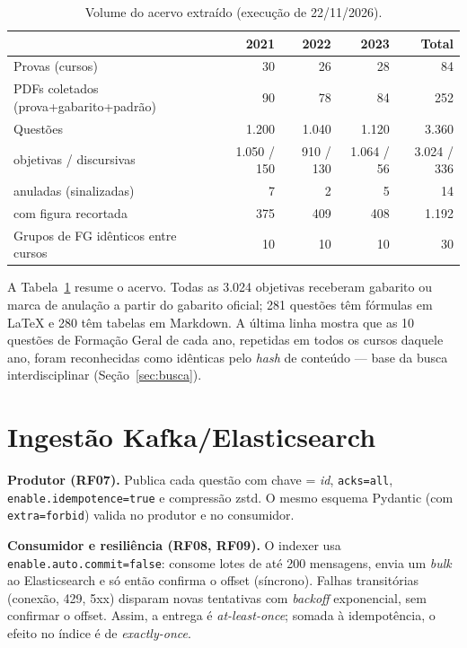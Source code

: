 \documentclass[12pt]{article}
\newcommand{\cod}[1]{\texttt{\small #1}}
\begin{document}
\begin{table}[ht]
\centering
\caption{Volume do acervo extraído (execução de 22/11/2026).}\label{tab:volume}
\small
\begin{tabular}{lrrrr}
\toprule
 & 2021 & 2022 & 2023 & Total \\
\midrule
Provas (cursos) & 30 & 26 & 28 & 84 \\
PDFs coletados (prova+gabarito+padrão) & 90 & 78 & 84 & 252 \\
Questões & 1.200 & 1.040 & 1.120 & 3.360 \\
\quad objetivas / discursivas & 1.050 / 150 & 910 / 130 & 1.064 / 56 & 3.024 / 336 \\
\quad anuladas (sinalizadas) & 7 & 2 & 5 & 14 \\
\quad com figura recortada & 375 & 409 & 408 & 1.192 \\
Grupos de FG idênticos entre cursos & 10 & 10 & 10 & 30 \\
\bottomrule
\end{tabular}
\end{table}

A Tabela~\ref{tab:volume} resume o acervo. Todas as 3.024 objetivas receberam gabarito ou marca de anulação a
partir do gabarito oficial; 281 questões têm fórmulas em LaTeX e 280 têm tabelas em Markdown. A última linha
mostra que as 10 questões de Formação Geral de cada ano, repetidas em todos os cursos daquele ano, foram
reconhecidas como idênticas pelo \textit{hash} de conteúdo --- base da busca interdisciplinar (Seção~\ref{sec:busca}).

\section{Ingestão Kafka/Elasticsearch}\label{sec:ingestao}

\textbf{Produtor (RF07).} Publica cada questão com chave = \textit{id}, \cod{acks=all},
\cod{enable.idempotence=true} e compressão zstd. O mesmo esquema Pydantic (com \cod{extra=forbid}) valida no
produtor e no consumidor.

\textbf{Consumidor e resiliência (RF08, RF09).} O indexer usa \cod{enable.auto.commit=false}: consome lotes de
até 200 mensagens, envia um \textit{bulk} ao Elasticsearch e só então confirma o offset (síncrono). Falhas
transitórias (conexão, 429, 5xx) disparam novas tentativas com \textit{backoff} exponencial, sem confirmar o
offset. Assim, a entrega é \textit{at-least-once}; somada à idempotência, o efeito no índice é de
\textit{exactly-once}.
\end{document}
